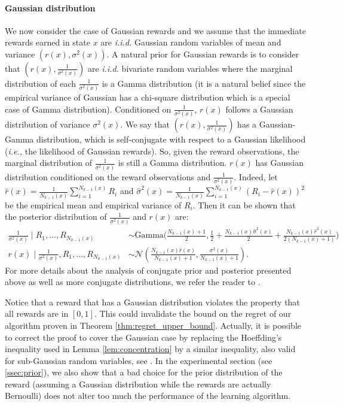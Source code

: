 \begin{subappendices}
\paragraph{Gaussian distribution}
We now consider the case of Gaussian rewards and we assume that the immediate rewards earned in state $x$ are \emph{i.i.d.} Gaussian random variables of mean and variance $(r(x), \sigma^2(x))$. 
A natural prior for Gaussian rewards is to consider that $(r(x), \frac1{\sigma^2(x)})$ are \emph{i.i.d.} bivariate random variables where the marginal distribution of each $\frac{1}{\sigma^2(x)}$ is a Gamma distribution (it is a natural belief since the empirical variance of Gaussian has a chi-square distribution which is a special case of Gamma distribution). 
Conditioned on $\frac1{\sigma^2(x)}$, $r(x)$ follows a Gaussian distribution of variance $\sigma^2(x)$. 
We say that $(r(x), \frac1{\sigma^2(x)})$ has a Gaussian-Gamma distribution, which is self-conjugate with respect to a Gaussian likelihood (\emph{i.e.,} the likelihood of Gaussian rewards). 
So, given the reward observations, the marginal distribution of $\frac{1}{\sigma^2(x)}$ is still a Gamma distribution. 
$r(x)$ has Gaussian distribution conditioned on the reward observations and $\frac1{\sigma^2(x)}$. 
Indeed, let $\hat{r}(x)=\frac{1}{N_{k-1}(x)}\sum_{i=1}^{N_{k-1}(x)}R_i$ and $\hat{\sigma}^2(x)=\frac{1}{N_{k-1}(x)}\sum_{i=1}^{N_{k-1}(x)}\left(R_i-\hat{r}(x)\right)^2$ be the empirical mean and empirical variance of $R_i$. Then it can be shown that the posterior distribution of $\frac{1}{\sigma^2(x)}$ and $r(x)$ are:
\begin{align*}
    \frac{1}{\sigma^2(x)}\mid R_1,\dots,R_{N_{k-1}(x)}&{\sim} 
    \mathrm{Gamma}\bigg(\frac{N_{k-1}(x){+}1}{2}, \frac{1}{2}{+}\frac{N_{k-1}(x)\hat{\sigma}^2(x)}{2} {+}\frac{N_{k-1}(x)\hat{r}^2(x)}{2(N_{k-1}(x){+}1)}\bigg)\\
    r(x)\mid \frac1{\sigma^2(x)}, R_1,\dots,R_{N_{k-1}(x)}&{\sim} \mathcal{N}\left(\frac{N_{k-1}(x)\hat{r}(x)}{N_{k-1}(x)+1}, \frac{\sigma^2(x)}{N_{k-1}(x)+1}\right).
\end{align*}
For more details about the analysis of conjugate prior and posterior presented above as well as more conjugate distributions, we refer the reader to \cite{fink1997compendium,murphy2007conjugate}.

Notice that a reward that has a Gaussian distribution violates the property that all rewards are in $[0,1]$.
This could invalidate the bound on the regret of our algorithm proven in Theorem \ref{thm:regret_upper_bound}. 
Actually, it is possible to correct the proof to cover the Gaussian case by replacing the Hoeffding's inequality used in Lemma \ref{lem:concentration} by a similar inequality, also valid for sub-Gaussian random variables, see \cite{vershynin2018high}. 
In the experimental section (see \ref{ssec:prior}), we also show that a bad choice for the prior distribution of the reward (assuming a Gaussian distribution while the rewards are actually Bernoulli) does not alter too much the performance of the learning algorithm. 


\end{subappendices}
